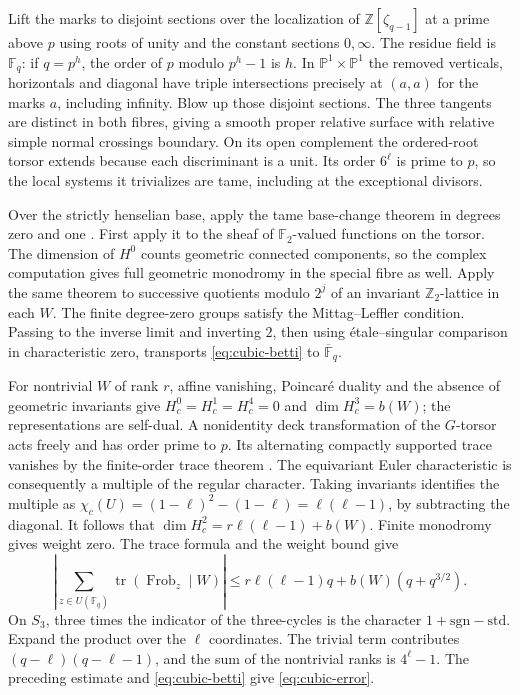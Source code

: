 \documentclass[preprint,12pt,numbers]{elsarticle}
\begin{document}
Lift the marks to disjoint sections over the localization of
$\mathbb Z[\zeta_{q-1}]$ at a prime above $p$ using roots of unity and
the constant sections $0,\infty$. The residue field is $\mathbb F_q$:
if $q=p^h$, the order of $p$ modulo $p^h-1$ is $h$. In
$\mathbb P^1\times\mathbb P^1$ the removed verticals, horizontals and
diagonal have triple intersections precisely at $(a,a)$ for the marks
$a$, including infinity. Blow up those disjoint sections. The three
tangents are distinct in both fibres, giving a smooth proper relative
surface with relative simple normal crossings boundary. On its open
complement the ordered-root torsor extends because each discriminant
is a unit. Its order $6^\ell$ is prime to $p$, so the local systems it
trivializes are tame, including at the exceptional divisors.

Over the strictly henselian base, apply the tame base-change theorem
in degrees zero and one \cite[Exp.~XIII, Cor.~2.9]{SGA1}. First apply
it to the sheaf of $\mathbb F_2$-valued functions on the torsor. The
dimension of $H^0$ counts geometric connected components, so the
complex computation gives full geometric monodromy in the special
fibre as well. Apply the same theorem to successive quotients modulo
$2^j$ of an invariant $\mathbb Z_2$-lattice in each $W$. The finite
degree-zero groups satisfy the Mittag--Leffler condition. Passing to
the inverse limit and inverting $2$, then using \'etale--singular
comparison in characteristic zero, transports \eqref{eq:cubic-betti}
to $\overline{\mathbb F}_q$.

For nontrivial $W$ of rank $r$, affine vanishing, Poincar\'e duality
and the absence of geometric invariants give $H_c^0=H_c^1=H_c^4=0$
and $\dim H_c^3=b(W)$; the representations are self-dual. A nonidentity
deck transformation of the $G$-torsor acts freely and has order prime
to $p$. Its alternating compactly supported trace vanishes by the
finite-order trace theorem \cite[Thm.~3.2, Prop.~3.12]{DL}. The
equivariant Euler characteristic is consequently a multiple of the
regular character. Taking invariants identifies the multiple as
$\chi_c(U)=(1-\ell)^2-(1-\ell)=\ell(\ell-1)$, by subtracting the
diagonal. It follows that $\dim H_c^2=r\ell(\ell-1)+b(W)$.
Finite monodromy gives weight zero. The trace formula and the weight
bound \cite[\S3.3]{WeilII} give
\[
 \left|\sum_{z\in U(\mathbb F_q)}
             \operatorname{tr}(\operatorname{Frob}_z\mid W)\right|
 \le r\ell(\ell-1)q+b(W)(q+q^{3/2}).
\]
On $S_3$, three times the indicator of the three-cycles is the character
$1+\mathrm{sgn}-\mathrm{std}$. Expand the product over the $\ell$
coordinates. The trivial term contributes $(q-\ell)(q-\ell-1)$, and
the sum of the nontrivial ranks is $4^\ell-1$. The preceding estimate
and \eqref{eq:cubic-betti} give \eqref{eq:cubic-error}.
\end{document}
